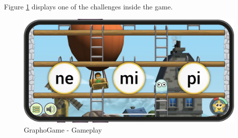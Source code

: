Figure \ref{fig:graphogame} displays one of the challenges inside the game.

\begin{figure}[H]
    \centering
    \includegraphics[width=0.8\linewidth]{Chapters/related_work_img/graphogamegameplay.png}
    \caption{GraphoGame - Gameplay}
    \label{fig:graphogame}
\end{figure}